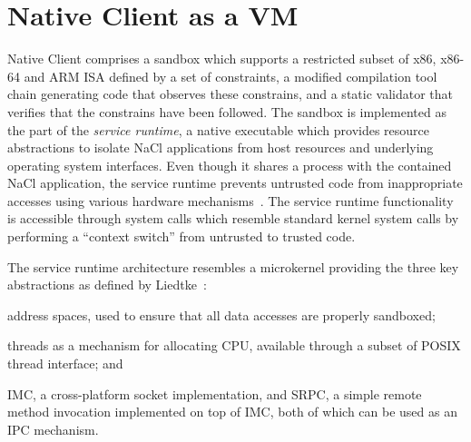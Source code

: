 \section{Native Client as a VM}
\label{sec:overview}

Native Client comprises a sandbox which supports a restricted
subset of x86, x86-64 and ARM ISA defined by a set of constraints, a
modified compilation tool chain generating code that observes these
constrains, and a static validator that verifies that the constrains
have been followed.  The sandbox is implemented as the part of the
\emph{service runtime}, a native executable which provides resource
abstractions to isolate NaCl applications from host resources and
underlying operating system interfaces. Even though it shares a process
with the contained NaCl application, the service runtime prevents
untrusted code from inappropriate accesses using various hardware
mechanisms~\cite{yee:ieee-sp09,sehr:usenix-sec10}. The service runtime
functionality is accessible through system calls which resemble standard
kernel system calls by performing a ``context switch'' from untrusted to
trusted code.



The service runtime architecture resembles a microkernel providing
the three key abstractions as defined by Liedtke~\cite{liedtke:sosp93}:
\begin{inparaenum}[(i)]
\item address spaces, used to ensure that all data accesses are properly
  sandboxed;
\item threads as a mechanism for allocating CPU, available through a subset
  of POSIX thread interface; and
\item IMC, a cross-platform socket implementation, and SRPC, a simple
  remote method invocation implemented on top of IMC, both of
  which can be used as an IPC mechanism.
\end{inparaenum}

